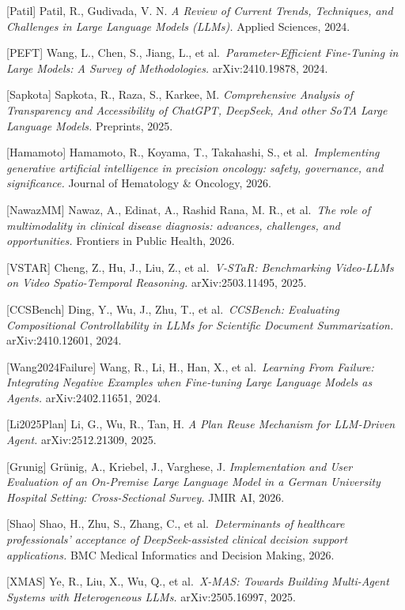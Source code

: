 {[}Patil{]} Patil, R., Gudivada, V. N. \emph{A Review of Current Trends, Techniques, and Challenges in Large Language Models (LLMs).} Applied Sciences, 2024.

{[}PEFT{]} Wang, L., Chen, S., Jiang, L., et al.~\emph{Parameter-Efficient Fine-Tuning in Large Models: A Survey of Methodologies.} arXiv:2410.19878, 2024.

{[}Sapkota{]} Sapkota, R., Raza, S., Karkee, M. \emph{Comprehensive Analysis of Transparency and Accessibility of ChatGPT, DeepSeek, And other SoTA Large Language Models.} Preprints, 2025.

{[}Hamamoto{]} Hamamoto, R., Koyama, T., Takahashi, S., et al.~\emph{Implementing generative artificial intelligence in precision oncology: safety, governance, and significance.} Journal of Hematology \& Oncology, 2026.

{[}NawazMM{]} Nawaz, A., Edinat, A., Rashid Rana, M. R., et al.~\emph{The role of multimodality in clinical disease diagnosis: advances, challenges, and opportunities.} Frontiers in Public Health, 2026.

{[}VSTAR{]} Cheng, Z., Hu, J., Liu, Z., et al.~\emph{V-STaR: Benchmarking Video-LLMs on Video Spatio-Temporal Reasoning.} arXiv:2503.11495, 2025.

{[}CCSBench{]} Ding, Y., Wu, J., Zhu, T., et al.~\emph{CCSBench: Evaluating Compositional Controllability in LLMs for Scientific Document Summarization.} arXiv:2410.12601, 2024.

{[}Wang2024Failure{]} Wang, R., Li, H., Han, X., et al.~\emph{Learning From Failure: Integrating Negative Examples when Fine-tuning Large Language Models as Agents.} arXiv:2402.11651, 2024.

{[}Li2025Plan{]} Li, G., Wu, R., Tan, H. \emph{A Plan Reuse Mechanism for LLM-Driven Agent.} arXiv:2512.21309, 2025.

{[}Grunig{]} Grünig, A., Kriebel, J., Varghese, J. \emph{Implementation and User Evaluation of an On-Premise Large Language Model in a German University Hospital Setting: Cross-Sectional Survey.} JMIR AI, 2026.

{[}Shao{]} Shao, H., Zhu, S., Zhang, C., et al.~\emph{Determinants of healthcare professionals' acceptance of DeepSeek-assisted clinical decision support applications.} BMC Medical Informatics and Decision Making, 2026.

{[}XMAS{]} Ye, R., Liu, X., Wu, Q., et al.~\emph{X-MAS: Towards Building Multi-Agent Systems with Heterogeneous LLMs.} arXiv:2505.16997, 2025.

